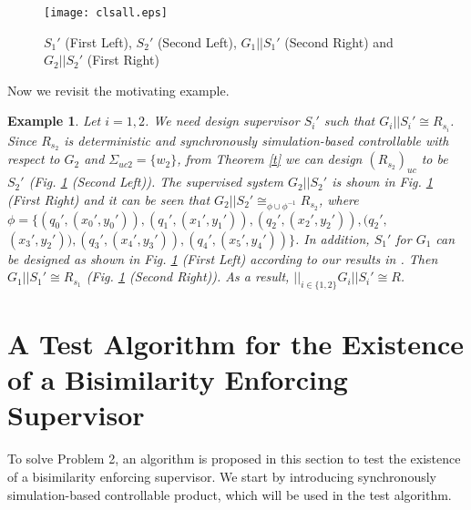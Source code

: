 \documentclass[preprint,authoryear,12pt]{elsarticle}
\newtheorem{Example}{Example}
\begin{document}
\begin{figure}[!htb]
\begin{center}
\texttt{[image: clsall.eps]}
\caption{ $S_1'$ (First Left), $S_2'$ (Second Left), $G_1||S_1'$
(Second Right) and $G_2||S_2'$ (First Right)} \label{moticls}
\end{center}
\end{figure}


Now we revisit the motivating example.

\begin{Example}\label{lcbis}
Let $i\!=1,2$. We need design supervisor $S_{i}'$ such that
$G_i||S_i' \cong R_{s_i}$. Since $R_{s_2}$ is deterministic and
synchronously simulation-based controllable with respect to $G_2$
and $\Sigma_{uc2}\!=\{w_2\}$, from Theorem \ref{t} we can design
$(R_{s_2})_{uc}$ to be $S_2'$ (Fig. \ref{moticls} (Second Left)).
The supervised system $G_2||S_2'$ is shown in Fig. \ref{moticls}
(First Right) and it can be seen that $G_2||S_2'\! \cong_{\phi
\cup \phi^{-1}} R_{s_2}$, where $\phi\!=\{(q_0', (x_0', y_0')),
(q_1', (x_1', y_1')),(q_2', (x_2', y_2')), (q_2', $ $(x_3',
y_2')),(q_3', (x_4', y_3')), (q_4', (x_5', y_4'))\}$. In addition,
$S_1'$ for $G_1$ can be designed as shown in Fig. \ref{moticls}
(First Left) according to our results in
\citep{sun2012bisimilarityacc}. Then $G_1||S_1' \cong R_{s_1}$
(Fig. \ref{moticls} (Second Right)). As a result, $||_{i \in \{1,
2\}}G_i||S_i' \cong R$.
\end{Example}






\section{A Test Algorithm for the Existence of a Bisimilarity
Enforcing Supervisor}

To solve Problem 2, an algorithm is proposed in this section to
test the existence of a bisimilarity enforcing supervisor. We
start by introducing synchronously simulation-based controllable
product, which will be used in the test algorithm.
\end{document}
